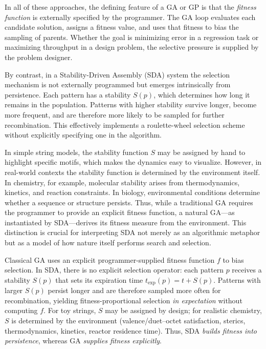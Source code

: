 \documentclass[life,article,submit,pdftex,moreauthors]{Definitions/mdpi}
\begin{document}
In all of these approaches, the defining feature of a GA or GP is that the \emph{fitness function} 
is externally specified by the programmer. The GA loop evaluates each candidate solution, assigns 
a fitness value, and uses that fitness to bias the sampling of parents. Whether the goal is 
minimizing error in a regression task or maximizing throughput in a design problem, the selective 
pressure is supplied by the problem designer.


By contrast, in a Stability-Driven Assembly (SDA) system the selection mechanism is not externally 
programmed but emerges intrinsically from persistence. Each pattern has a stability $S(p)$, 
which determines how long it remains in the population. Patterns with higher stability survive 
longer, become more frequent, and are therefore more likely to be sampled for further 
recombination. This effectively implements a roulette-wheel selection scheme without explicitly 
specifying one in the algorithm.

In simple string models, the stability function $S$ may be assigned by hand to highlight specific 
motifs, which makes the dynamics easy to visualize. However, in real-world contexts the stability 
function is determined by the environment itself. In chemistry, for example, molecular stability 
arises from thermodynamics, kinetics, and reaction constraints. In biology, environmental conditions 
determine whether a sequence or structure persists. Thus, while a traditional GA requires the 
programmer to provide an explicit fitness function, a natural GA---as instantiated by SDA---derives 
its fitness measure from the environment. This distinction is crucial for interpreting SDA not 
merely as an algorithmic metaphor but as a model of how nature itself performs search and selection.

Classical GA uses an explicit programmer-supplied fitness function $f$ to bias selection. 
In SDA, there is no explicit selection operator: each pattern $p$ receives a stability 
$S(p)$ that sets its expiration time $t_{\exp}(p)=t+S(p)$. Patterns with larger $S(p)$ 
persist longer and are therefore sampled more often for recombination, yielding 
fitness-proportional selection \emph{in expectation} without computing $f$. 
For toy strings, $S$ may be assigned by design; for realistic chemistry, $S$ is determined 
by the environment (valence/duet–octet satisfaction, sterics, thermodynamics, kinetics, 
reactor residence time). Thus, SDA \emph{builds fitness into persistence}, whereas GA 
\emph{supplies fitness explicitly}.
\end{document}

